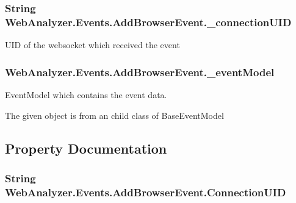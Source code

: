 \subsubsection[{\+\_\+connection\+U\+I\+D}]{\setlength{\rightskip}{0pt plus 5cm}String Web\+Analyzer.\+Events.\+Add\+Browser\+Event.\+\_\+connection\+U\+I\+D\hspace{0.3cm}{\ttfamily [private]}}\label{class_web_analyzer_1_1_events_1_1_add_browser_event_ab10f41d4f0eb3043a6be0c1c1c5f96e8}


U\+I\+D of the websocket which received the event 

\hypertarget{class_web_analyzer_1_1_events_1_1_add_browser_event_a69a19a4ef8398fb9710d0d0f0a69ad1f}{}
\subsubsection[{\+\_\+event\+Model}]{ Web\+Analyzer.\+Events.\+Add\+Browser\+Event.\+\_\+event\+Model\hspace{0.3cm}{\ttfamily [private]}}\label{class_web_analyzer_1_1_events_1_1_add_browser_event_a69a19a4ef8398fb9710d0d0f0a69ad1f}


Event\+Model which contains the event data. 

The given object is from an child class of Base\+Event\+Model 

\subsection{Property Documentation}
\hypertarget{class_web_analyzer_1_1_events_1_1_add_browser_event_a557993a53c4caa39aea3697db56cd0b5}{}
\subsubsection[{Connection\+U\+I\+D}]{\setlength{\rightskip}{0pt plus 5cm}String Web\+Analyzer.\+Events.\+Add\+Browser\+Event.\+Connection\+U\+I\+D\hspace{0.3cm}{\ttfamily [get]}}\label{class_web_analyzer_1_1_events_1_1_add_browser_event_a557993a53c4caa39aea3697db56cd0b5}


